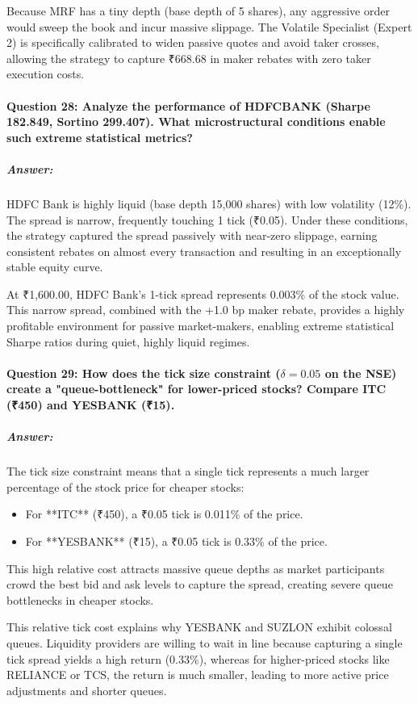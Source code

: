 \documentclass[11pt,a4paper]{article}
\begin{document}
Because MRF has a tiny depth (base depth of 5 shares), any aggressive order would sweep the book and incur massive slippage. The Volatile Specialist (Expert 2) is specifically calibrated to widen passive quotes and avoid taker crosses, allowing the strategy to capture ₹668.68 in maker rebates with zero taker execution costs.

\paragraph{Question 28: Analyze the performance of HDFCBANK (Sharpe 182.849, Sortino 299.407). What microstructural conditions enable such extreme statistical metrics?}
\subparagraph{Answer:}
HDFC Bank is highly liquid (base depth 15,000 shares) with low volatility (12\%). The spread is narrow, frequently touching 1 tick (₹0.05). Under these conditions, the strategy captured the spread passively with near-zero slippage, earning consistent rebates on almost every transaction and resulting in an exceptionally stable equity curve.

At ₹1,600.00, HDFC Bank's 1-tick spread represents 0.003\% of the stock value. This narrow spread, combined with the +1.0 bp maker rebate, provides a highly profitable environment for passive market-makers, enabling extreme statistical Sharpe ratios during quiet, highly liquid regimes.

\paragraph{Question 29: How does the tick size constraint ($\delta = 0.05$ on the NSE) create a "queue-bottleneck" for lower-priced stocks? Compare ITC (₹450) and YESBANK (₹15).}
\subparagraph{Answer:}
The tick size constraint means that a single tick represents a much larger percentage of the stock price for cheaper stocks:
\begin{itemize}
    \item For **ITC** (₹450), a ₹0.05 tick is 0.011\% of the price.
    \item For **YESBANK** (₹15), a ₹0.05 tick is 0.33\% of the price.
\end{itemize}
This high relative cost attracts massive queue depths as market participants crowd the best bid and ask levels to capture the spread, creating severe queue bottlenecks in cheaper stocks.

This relative tick cost explains why YESBANK and SUZLON exhibit colossal queues. Liquidity providers are willing to wait in line because capturing a single tick spread yields a high return (0.33\%), whereas for higher-priced stocks like RELIANCE or TCS, the return is much smaller, leading to more active price adjustments and shorter queues.
\end{document}
